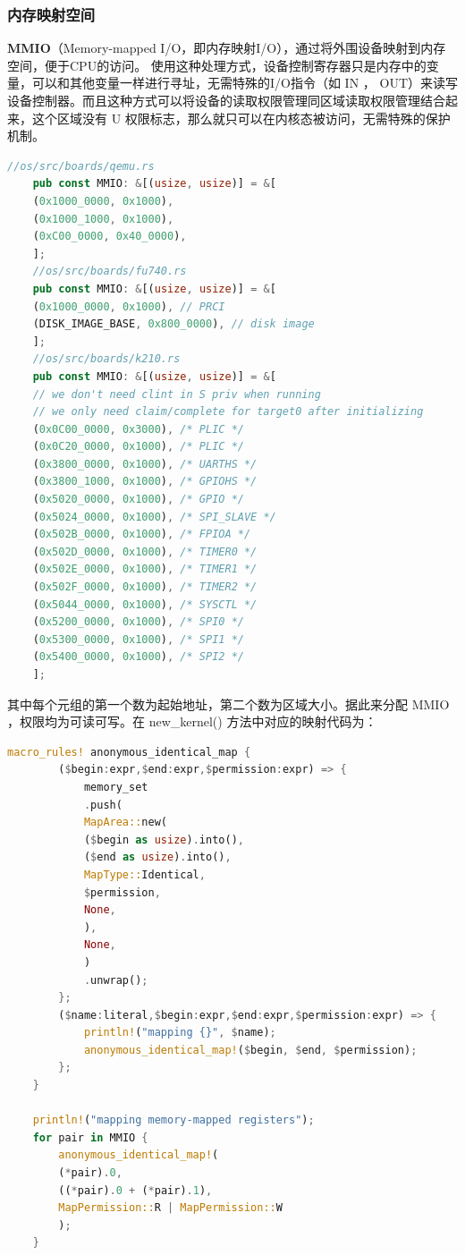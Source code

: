\subsubsection{内存映射空间}

\textbf{MMIO}（Memory-mapped
I/O，即内存映射I/O），通过将外围设备映射到内存空间，便于CPU的访问。
使用这种处理方式，设备控制寄存器只是内存中的变量，可以和其他变量一样进行寻址，无需特殊的I/O指令（如 IN ， OUT）来读写设备控制器。而且这种⽅式可以将设备的读取权限管理同区域读取权限管理结合起来，这个区域没有 U 权限标志，那么就只可以在内核态被访问，无需特殊的保护机制。

\begin{lstlisting}[language={Rust}, label={code:forktest},
	caption={//os/board}]
	//os/src/boards/qemu.rs
	pub const MMIO: &[(usize, usize)] = &[
	(0x1000_0000, 0x1000),
	(0x1000_1000, 0x1000),
	(0xC00_0000, 0x40_0000),
	];
	//os/src/boards/fu740.rs
	pub const MMIO: &[(usize, usize)] = &[
	(0x1000_0000, 0x1000), // PRCI
	(DISK_IMAGE_BASE, 0x800_0000), // disk image
	];
	//os/src/boards/k210.rs
	pub const MMIO: &[(usize, usize)] = &[
	// we don't need clint in S priv when running
	// we only need claim/complete for target0 after initializing
	(0x0C00_0000, 0x3000), /* PLIC */
	(0x0C20_0000, 0x1000), /* PLIC */
	(0x3800_0000, 0x1000), /* UARTHS */
	(0x3800_1000, 0x1000), /* GPIOHS */
	(0x5020_0000, 0x1000), /* GPIO */
	(0x5024_0000, 0x1000), /* SPI_SLAVE */
	(0x502B_0000, 0x1000), /* FPIOA */
	(0x502D_0000, 0x1000), /* TIMER0 */
	(0x502E_0000, 0x1000), /* TIMER1 */
	(0x502F_0000, 0x1000), /* TIMER2 */
	(0x5044_0000, 0x1000), /* SYSCTL */
	(0x5200_0000, 0x1000), /* SPI0 */
	(0x5300_0000, 0x1000), /* SPI1 */
	(0x5400_0000, 0x1000), /* SPI2 */
	];
\end{lstlisting}
其中每个元组的第一个数为起始地址，第二个数为区域大小。据此来分配 MMIO
，权限均为可读可写。在 new\_kernel() 方法中对应的映射代码为：
\begin{lstlisting}[language={Rust}, label={code:forktest},
	caption={//os/mm/memory\_set.rs}]
	macro_rules! anonymous_identical_map {
		($begin:expr,$end:expr,$permission:expr) => {
			memory_set
			.push(
			MapArea::new(
			($begin as usize).into(),
			($end as usize).into(),
			MapType::Identical,
			$permission,
			None,
			),
			None,
			)
			.unwrap();
		};
		($name:literal,$begin:expr,$end:expr,$permission:expr) => {
			println!("mapping {}", $name);
			anonymous_identical_map!($begin, $end, $permission);
		};
	}   
	
	println!("mapping memory-mapped registers");
	for pair in MMIO {
		anonymous_identical_map!(
		(*pair).0,
		((*pair).0 + (*pair).1),
		MapPermission::R | MapPermission::W
		);
	}
\end{lstlisting}


